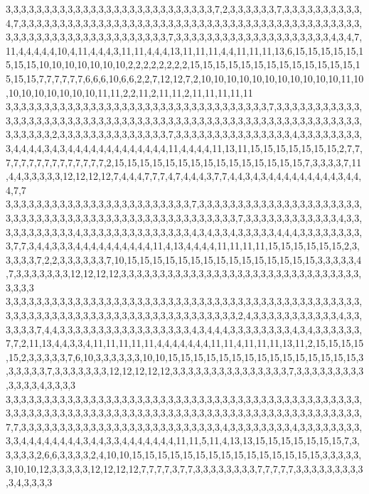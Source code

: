 3,3,3,3,3,3,3,3,3,3,3,3,3,3,3,3,3,3,3,3,3,3,3,3,3,3,3,7,2,3,3,3,3,3,3,7,3,3,3,3,3,3,3,3,3,3,4,7,3,3,3,3,3,3,3,3,3,3,3,3,3,3,3,3,3,3,3,3,3,3,3,3,3,3,3,3,3,3,3,3,3,3,3,3,3,3,3,3,3,3,3,3,3,3,3,3,3,3,3,3,3,3,3,3,3,3,3,3,3,3,3,3,3,7,3,3,3,3,3,3,3,3,3,3,3,3,3,3,3,3,3,3,3,3,4,3,4,7,11,4,4,4,4,4,10,4,11,4,4,4,3,11,11,4,4,4,13,11,11,11,4,4,11,11,11,13,6,15,15,15,15,15,15,15,15,10,10,10,10,10,10,10,2,2,2,2,2,2,2,2,15,15,15,15,15,15,15,15,15,15,15,15,15,15,15,15,7,7,7,7,7,7,6,6,6,10,6,6,2,2,7,12,12,7,2,10,10,10,10,10,10,10,10,10,10,10,11,10,10,10,10,10,10,10,10,11,11,2,2,11,2,11,11,2,11,11,11,11,11
3,3,3,3,3,3,3,3,3,3,3,3,3,3,3,3,3,3,3,3,3,3,3,3,3,3,3,3,3,3,3,3,3,3,7,3,3,3,3,3,3,3,3,3,3,3,3,3,3,3,3,3,3,3,3,3,3,3,3,3,3,3,3,3,3,3,3,3,3,3,3,3,3,3,3,3,3,3,3,3,3,3,3,3,3,3,3,3,3,3,3,3,3,3,3,3,3,3,2,3,3,3,3,3,3,3,3,3,3,3,3,3,3,7,3,3,3,3,3,3,3,3,3,3,3,3,3,3,3,4,3,3,3,3,3,3,3,3,3,4,4,4,4,3,4,3,4,4,4,4,4,4,4,4,4,4,4,4,4,11,4,4,4,4,11,13,11,15,15,15,15,15,15,15,2,7,7,7,7,7,7,7,7,7,7,7,7,7,7,7,2,15,15,15,15,15,15,15,15,15,15,15,15,15,15,15,7,3,3,3,3,7,11,4,4,3,3,3,3,3,12,12,12,12,7,4,4,4,7,7,7,4,7,4,4,4,3,7,7,4,4,3,4,3,4,4,4,4,4,4,4,4,4,3,4,4,4,7,7
3,3,3,3,3,3,3,3,3,3,3,3,3,3,3,3,3,3,3,3,3,3,3,3,7,3,3,3,3,3,3,3,3,3,3,3,3,3,3,3,3,3,3,3,3,3,3,3,3,3,3,3,3,3,3,3,3,3,3,3,3,3,3,3,3,3,3,3,3,3,3,3,3,3,3,3,7,3,3,3,3,3,3,3,3,3,3,3,3,4,3,3,3,3,3,3,3,3,3,3,3,4,3,3,3,3,3,3,3,3,3,3,3,3,3,3,4,3,4,3,3,4,3,3,3,3,3,4,4,4,3,3,3,3,3,3,3,3,3,7,7,3,4,4,3,3,3,4,4,4,4,4,4,4,4,4,4,11,4,13,4,4,4,4,11,11,11,11,15,15,15,15,15,15,2,3,3,3,3,3,7,2,2,3,3,3,3,3,3,7,10,15,15,15,15,15,15,15,15,15,15,15,15,15,15,15,3,3,3,3,3,4,7,3,3,3,3,3,3,3,12,12,12,12,3,3,3,3,3,3,3,3,3,3,3,3,3,3,3,3,3,3,3,3,3,3,3,3,3,3,3,3,3,3,3,3,3,3,3
3,3,3,3,3,3,3,3,3,3,3,3,3,3,3,3,3,3,3,3,3,3,3,3,3,3,3,3,3,3,3,3,3,3,3,3,3,3,3,3,3,3,3,3,3,3,3,3,3,3,3,3,3,3,3,3,3,3,3,3,3,3,3,3,3,3,3,3,3,3,3,3,3,3,3,3,2,4,3,3,3,3,3,3,3,3,3,3,3,4,3,3,3,3,3,3,7,4,4,3,3,3,3,3,3,3,3,3,3,3,3,3,3,3,3,3,4,3,4,4,4,3,3,3,3,3,3,3,3,4,3,4,3,3,3,3,3,3,7,7,2,11,13,4,4,3,3,4,11,11,11,11,11,4,4,4,4,4,4,4,11,11,4,11,11,11,13,11,2,15,15,15,15,15,2,3,3,3,3,3,7,6,10,3,3,3,3,3,3,10,10,15,15,15,15,15,15,15,15,15,15,15,15,15,15,15,3,3,3,3,3,3,7,3,3,3,3,3,3,3,12,12,12,12,12,3,3,3,3,3,3,3,3,3,3,3,3,3,3,3,7,3,3,3,3,3,3,3,3,3,3,3,3,3,4,3,3,3,3
3,3,3,3,3,3,3,3,3,3,3,3,3,3,3,3,3,3,3,3,3,3,3,3,3,3,3,3,3,3,3,3,3,3,3,3,3,3,3,3,3,3,3,3,3,3,3,3,3,3,3,3,3,3,3,3,3,3,3,3,3,3,3,3,3,3,3,3,3,3,3,3,3,3,3,3,3,3,3,3,3,3,3,3,3,3,3,3,3,3,3,3,7,7,3,3,3,3,3,3,3,3,3,3,3,3,3,3,3,3,3,3,3,3,3,3,3,3,3,3,4,3,3,3,3,3,3,3,3,4,3,3,3,3,3,3,3,3,3,3,4,4,4,4,4,4,4,4,3,4,4,3,3,4,4,4,4,4,4,4,11,11,5,11,4,13,13,15,15,15,15,15,15,15,7,3,3,3,3,3,2,6,6,3,3,3,3,2,4,10,10,15,15,15,15,15,15,15,15,15,15,15,15,15,15,15,3,3,3,3,3,3,10,10,12,3,3,3,3,3,12,12,12,12,7,7,7,7,3,7,7,3,3,3,3,3,3,3,3,7,7,7,7,7,3,3,3,3,3,3,3,3,3,3,4,3,3,3,3
